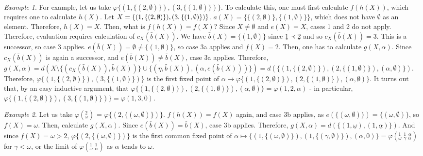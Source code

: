 \documentclass{article}
\theoremstyle{definition}
\theoremstyle{plain}
\theoremstyle{plain}
\theoremstyle{plain}
\theoremstyle{plain}
\theoremstyle{remark}
\theoremstyle{remark}
\newtheorem{example}{Example}
\theoremstyle{remark}
\theoremstyle{plain}
\theoremstyle{plain}
\begin{document}
\begin{example}
For example, let us take $\varphi\{(1, \{(2, \emptyset)\}), (3, \{(1, \emptyset)\})\}$. To calculate this, one must first calculate $f(h(X))$, which requires one to calculate $h(X)$. Let $X = \{(1, \{(2, \emptyset)\}), (3, \{(1, \\ \emptyset)\})\}$. $a(X) = \{\{(2, \emptyset)\},\{(1, \emptyset)\}\}$, which does not have $\emptyset$ as an element. Therefore, $h(X) = X$. Then, what is $f(h(X)) = f(X)$? Since $X \neq \emptyset$ and $e(X) = X$, cases 1 and 2 do not apply. Therefore, evaluation requires calculation of $c_X(\bar{b}(X))$. We have $\bar{b}(X) = \{(1,\emptyset)\}$ since $\underline{1} \prec \underline{2}$ and so $c_X(\bar{b}(X)) = 3$. This is a successor, so case 3 applies. $e(\bar{b}(X)) = \emptyset \neq \{(1,\emptyset)\}$, so case 3a applies and $f(X) = 2$. Then, one has to calculate $g(X, \alpha)$. Since $c_X(\bar{b}(X))$ is again a successor, and $e(\bar{b}(X)) \neq \bar{b}(X)$, case 3a applies. Therefore, $g(X, \alpha) = d(X \setminus \{(c_X(\bar{b}(X)), \bar{b}(X))\} \cup \{(\eta,\bar{b}(X)),(\alpha, e(\bar{b}(X)))\}) = d(\{(1, \{(2,\emptyset)\}), (2, \{(1, \emptyset)\}), (\alpha, \emptyset)\})$. Therefore, $\varphi\{(1, \{(2, \emptyset)\}), (3, \{(1, \emptyset)\})\}$ is the first fixed point of $\alpha \mapsto \varphi \{(1, \{(2,\emptyset)\}), (2, \{(1, \emptyset)\}), (\alpha, \emptyset)\}$. It turns out that, by an easy inductive argument, that $\varphi \{(1, \{(2,\emptyset)\}), (2, \{(1, \emptyset)\}), (\alpha, \emptyset)\} = \varphi(1, 2, \alpha)$ - in particular, $\varphi\{(1, \{(2, \emptyset)\}), (3, \{(1, \emptyset)\})\} = \varphi(1, 3, 0)$.
\end{example}

\begin{example}
Let us take $\varphi({}^2_\omega)$ = $\varphi\{(2,\{(\omega,\emptyset)\})\}$. $f(h(X)) = f(X)$ again, and case 3b applies, as $e(\{(\omega,\emptyset)\}) = \{(\omega,\emptyset)\}$, so $f(X) = \omega$. Then, calculate $g(X,\alpha)$. Since $e(\overline{b}(X)) = \overline{b}(X)$, case 3b applies. Therefore, $g(X,\alpha) = d(\{(1,\underline{\omega}),(1,\underline{\alpha})\})$. And since $f(X) = \omega > 2$, $\varphi\{(2,\{(\omega,\emptyset)\})\}$ is the first common fixed point of $\alpha\mapsto\{(1,\{(\omega,\emptyset)\}),(1,\{(\gamma,\emptyset)\}),(\alpha,0)\} = \varphi({}^1_\omega\;{}^1_\gamma\;{}^\alpha_0)$ for $\gamma<\omega$, or the limit of $\varphi({}^1_\omega\;{}^1_\alpha)$ as $\alpha$ tends to $\omega$.
\end{example}
\end{document}
